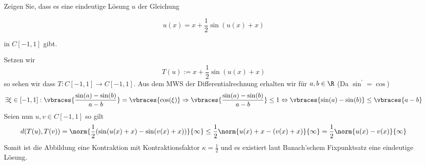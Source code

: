\begin{exercise}

Zeigen Sie, dass es eine eindeutige Lösung $u$ der Gleichung

\begin{equation*}
  u(x) = x + \frac{1}{2}\sin(u(x)+x)
\end{equation*}

in $C[-1,1]$ gibt.

\end{exercise}

\begin{solution}

Setzen wir
\begin{equation*}
  T(u) :=  x + \frac{1}{2}\sin(u(x)+x)
\end{equation*}
so sehen wir dass $T: C[-1,1] \rightarrow C[-1,1]$.
Aus dem MWS der Differentialrechnung erhalten wir für $a,b \in \R$
(Da $\sin^\prime = \cos$)
\begin{align*}
  \exists \xi \in [-1,1]:
  \vbraces{\frac{\sin(a)-\sin(b)}{a-b}} = \vbraces{\cos(\xi)} \Rightarrow
  \vbraces{\frac{\sin(a)-\sin(b)}{a-b}} \leq 1 \Leftrightarrow
  \vbraces{\sin(a)-\sin(b)} \leq \vbraces{a-b}
\end{align*}
Seien nun $u,v \in C[-1,1]$ so gilt
\begin{align*}
  d(T(u),T(v)) = \norm{\frac{1}{2}(\sin(u(x)+x)-\sin(v(x)+x))}{\infty}
  \leq \frac{1}{2}\norm{u(x)+x-(v(x)+x)}{\infty}
  = \frac{1}{2}\norm{u(x)-v(x)}{\infty}
\end{align*}
Somit ist die Abbildung eine Kontraktion mit Kontraktionsfaktor
$\kappa = \frac{1}{2}$ und es existiert laut Banach'schem Fixpunktsatz eine
eindeutige Lösung.
\end{solution}
